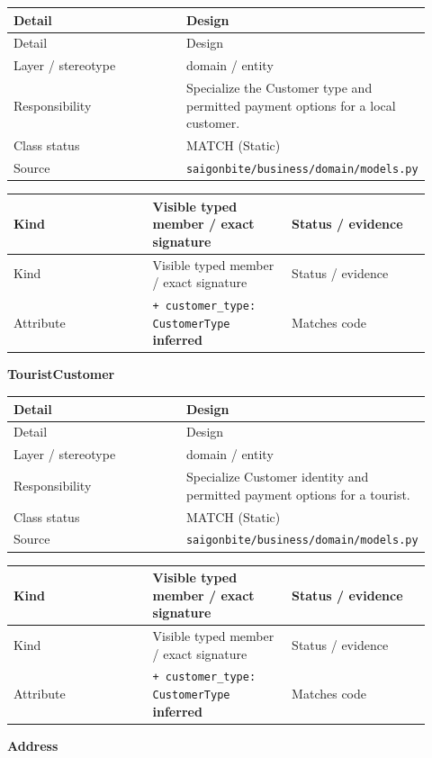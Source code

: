 \begin{longtable}{>{\raggedright\arraybackslash}p{0.4600\linewidth}>{\raggedright\arraybackslash}p{0.4600\linewidth}}
Detail & Design \\
\hline\endfirsthead
Detail & Design \\
\hline\endhead
Layer / stereotype & domain / \guillemotleft{}entity\guillemotright{} \\
Responsibility & Specialize the Customer type and permitted payment options for a local customer. \\
Class status & MATCH (Static) \\
Source & \texttt{saigonbite/\allowbreak{}business/\allowbreak{}domain/\allowbreak{}models.\allowbreak{}py} \\
\end{longtable}
\begin{longtable}{>{\raggedright\arraybackslash}p{0.3067\linewidth}>{\raggedright\arraybackslash}p{0.3067\linewidth}>{\raggedright\arraybackslash}p{0.3067\linewidth}}
Kind & Visible typed member / exact signature & Status / evidence \\
\hline\endfirsthead
Kind & Visible typed member / exact signature & Status / evidence \\
\hline\endhead
Attribute & \texttt{+ customer\_\allowbreak{}type: CustomerType} \textbf{inferred} & Matches code \\
\end{longtable}
\textbf{TouristCustomer}

\begin{longtable}{>{\raggedright\arraybackslash}p{0.4600\linewidth}>{\raggedright\arraybackslash}p{0.4600\linewidth}}
Detail & Design \\
\hline\endfirsthead
Detail & Design \\
\hline\endhead
Layer / stereotype & domain / \guillemotleft{}entity\guillemotright{} \\
Responsibility & Specialize Customer identity and permitted payment options for a tourist. \\
Class status & MATCH (Static) \\
Source & \texttt{saigonbite/\allowbreak{}business/\allowbreak{}domain/\allowbreak{}models.\allowbreak{}py} \\
\end{longtable}
\begin{longtable}{>{\raggedright\arraybackslash}p{0.3067\linewidth}>{\raggedright\arraybackslash}p{0.3067\linewidth}>{\raggedright\arraybackslash}p{0.3067\linewidth}}
Kind & Visible typed member / exact signature & Status / evidence \\
\hline\endfirsthead
Kind & Visible typed member / exact signature & Status / evidence \\
\hline\endhead
Attribute & \texttt{+ customer\_\allowbreak{}type: CustomerType} \textbf{inferred} & Matches code \\
\end{longtable}
\textbf{Address}

